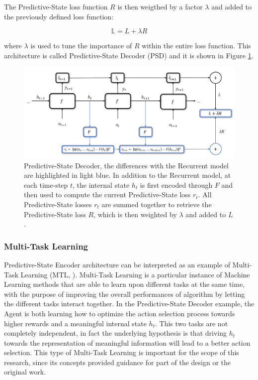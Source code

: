                 \noindent
                The Predictive-State loss function $R$ is then weigthed by a factor $\lambda$ and added to the previously defined loss function:
                
                \[ \mathbb{L} = L + \lambda R\]
                
                where $\lambda$ is used to tune the importance of $R$ within the entire loss function. This architecture is called Predictive-State Decoder (PSD) and it is shown in Figure \ref{fig:pomdp_psd}. 
                
                \begin{figure}[!t]
                    \centering
                    \includegraphics[width=15cm, keepaspectratio]{images/pomdp/pomdp_psd.png}
                    \caption{Predictive-State Decoder, the differences with the Recurrent model are highlighted in light blue. In addition to the Recurrent model, at each time-step $t$, the internal state $h_t$ is first encoded through $F$ and then used to compute the current Predictive-State loss $r_t$. All Predictive-State losses $r_t$ are summed together to retrieve the Predictive-State loss $R$, which is then weighted by $\lambda$ and added to $L$.}
                    \label{fig:pomdp_psd}
                \end{figure}
                
            \subsubsection{Multi-Task Learning}
                Predictive-State Encoder architecture can be interpreted as an example of Multi-Task Learning (MTL, ). Multi-Task Learning is a particular instance of Machine Learning methods that are able to learn upon different tasks at the same time, with the purpose of improving the overall performances of algorithm by letting the different tasks interact together. In the Predictive-State Decoder example, the Agent is both learning how to optimize the action selection process towards higher rewards and a meaningful internal state $h_t$. This two tasks are not completely independent, in fact the underlying hypothesis is that driving $h_t$ towards the representation of meaningful information will lead to a better action selection. This type of Multi-Task Learning is important for the scope of this research, since its concepts provided guidance for part of the design or the original work.
                
